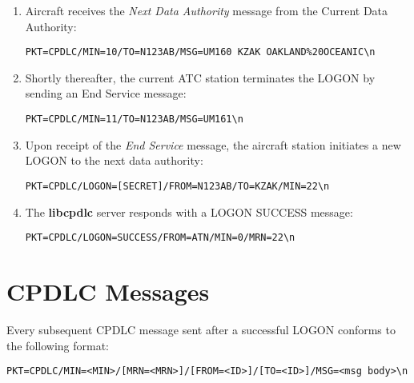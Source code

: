 \documentclass[a4paper,12pt]{article}
\newcommand{\libcpdlc}{\textbf{libcpdlc}\xspace}
\begin{document}
\begin{enumerate}

\item Aircraft receives the {\em Next Data Authority} message from the
Current Data Authority:

\begin{verbatim}
PKT=CPDLC/MIN=10/TO=N123AB/MSG=UM160 KZAK OAKLAND%20OCEANIC\n
\end{verbatim}

\item Shortly thereafter, the current ATC station terminates the LOGON by
sending an End Service message:

\begin{verbatim}
PKT=CPDLC/MIN=11/TO=N123AB/MSG=UM161\n
\end{verbatim}

\item Upon receipt of the {\em End Service} message, the aircraft station
initiates a new LOGON to the next data authority:

\begin{verbatim}
PKT=CPDLC/LOGON=[SECRET]/FROM=N123AB/TO=KZAK/MIN=22\n
\end{verbatim}

\item The \libcpdlc server responds with a LOGON SUCCESS message:

\begin{verbatim}
PKT=CPDLC/LOGON=SUCCESS/FROM=ATN/MIN=0/MRN=22\n
\end{verbatim}

\end{enumerate}

\section{CPDLC Messages}

Every subsequent CPDLC message sent after a successful LOGON conforms to
the following format:

\begin{verbatim}
PKT=CPDLC/MIN=<MIN>/[MRN=<MRN>]/[FROM=<ID>]/[TO=<ID>]/MSG=<msg body>\n
\end{verbatim}
\end{document}
